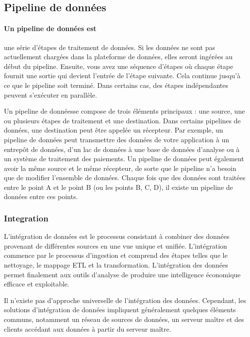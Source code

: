     \subsection{Pipeline de données}
    \paragraph*{Un pipeline de données est} une série d'étapes de traitement de données. Si les données ne sont pas actuellement chargées dans la plateforme de données, elles seront ingérées au début du pipeline. Ensuite, vous avez une séquence d'étapes où chaque étape fournit une sortie qui devient l'entrée de l'étape suivante. Cela continue jusqu'à ce que le pipeline soit terminé. Dans certains cas, des étapes indépendantes peuvent s'exécuter en parallèle.  
    
    Un pipeline de donnéesse compose de trois éléments principaux : une source, une ou plusieurs étapes de traitement et une destination. Dans certains pipelines de données, une destination peut être appelée un récepteur. Par exemple, un pipeline de données peut transmettre des données de votre application à un entrepôt de données, d'un lac de données à une base de données d'analyse ou à un système de traitement des paiements. Un pipeline de données peut également avoir la même source et le même récepteur, de sorte que le pipeline n'a besoin que de modifier l'ensemble de données. Chaque fois que des données sont traitées entre le point A et le point B (ou les points B, C, D), il existe un pipeline de données entre ces points.

        \subsubsection{Integration}
        L'intégration de données est le processus consistant à combiner des données provenant de différentes sources en une vue unique et unifiée. L'intégration commence par le processus d'ingestion et comprend des étapes telles que le nettoyage, le mappage ETL et la transformation. L'intégration des données permet finalement aux outils d'analyse de produire une intelligence économique efficace et exploitable.

        Il n'existe pas d'approche universelle de l'intégration des données. Cependant, les solutions d'intégration de données impliquent généralement quelques éléments communs, notamment un réseau de sources de données, un serveur maître et des clients accédant aux données à partir du serveur maître.

